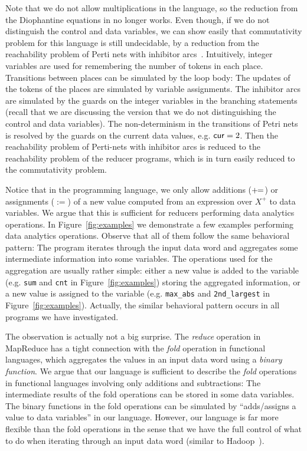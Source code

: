Note that we do not allow multiplications in the language, so the reduction from the Diophantine equations in \cite{CHSW15} no longer works. Even though, if we do not distinguish the control and data variables, we can show easily that commutativity problem for this language is still undecidable, by a reduction from the reachability problem of Perti nets with inhibitor arcs~\cite{Min71,Rei08}.
Intuitively, integer variables are used for remembering the number of tokens in each place. Transitions between places can be simulated by the loop body: The updates of the tokens of the places are simulated by variable assignments.
The inhibitor arcs are simulated by the guards on the integer variables in the branching statements (recall that we are discussing the version that we do not distinguishing the control and data variables). The non-determinism in the transitions of Petri nets is resolved by the guards on the current data values, e.g. $\mathsf{cur} = 2$. 
Then the reachability problem of Perti-nets with inhibitor arcs is reduced to the reachability problem of the reducer programs, which is in turn easily reduced to the commutativity problem.

Notice that in the programming language, we only allow additions ($+\!\!=$) or assignments ($:=$) of a new value computed from an expression over $X^+$ to data variables. 
We argue that this is sufficient for reducers performing data analytics operations.
In Figure~\ref{fig:examples} we demonstrate a few examples performing data analytics operations. Observe that all of them follow the same behavioral pattern: The program iterates through the input data word and aggregates some intermediate information into some variables. The operations used for the aggregation are usually rather simple: either a new value is added to the variable (e.g. \texttt{sum} and \texttt{cnt} in Figure~\ref{fig:examples}) storing the aggregated information, or a new value is assigned to the variable (e.g. \texttt{max\_abs} and \texttt{2nd\_largest} in Figure~\ref{fig:examples}). Actually, the similar behavioral pattern occurs in all programs we have investigated.




The observation is actually not a big surprise. The \emph{reduce} operation in MapReduce has a tight connection with the \emph{fold} operation in functional languages, which aggregates the values in an input data word using a \emph{binary function}. We argue that our language is sufficient to describe the \emph{fold} operations in functional languages involving only additions and subtractions: The intermediate results of the fold operations can be stored in some data variables. The binary functions in the fold operations can be simulated by ``adds/assigns a value to data variables'' in our language. However, our language is far more flexible than the fold operations in the sense that we have the full control of what to do when iterating through an input data word (similar to Hadoop~\cite{Hadoop}).
 

